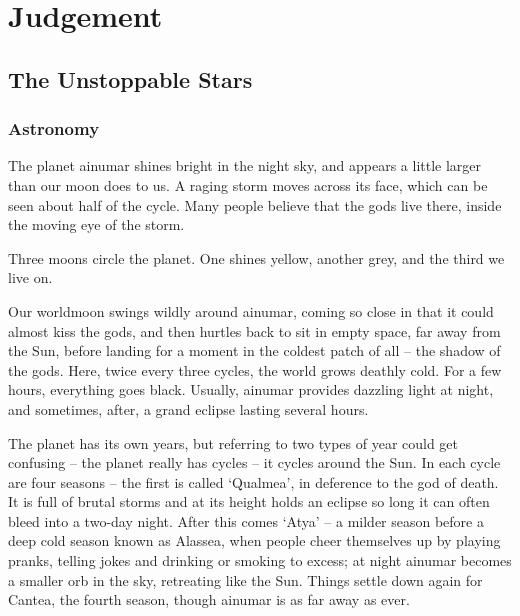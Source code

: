 \chapter[Bastion of Judgement]{Judgement}

\section{The Unstoppable Stars}
\label{astronomy}
\label{seasons}

\begin{multicols}{2}

\setcounter{season}{\month}

\subsection{Astronomy}

The planet \gls{ainumar} shines bright in the night sky, and appears a little larger than our moon does to us.
A raging storm moves across its face, which can be seen about half of the cycle.
Many people believe that the gods live there, inside the moving eye of the storm.

Three moons circle the planet.
One shines yellow, another grey, and the third we live on.

Our worldmoon swings wildly around \gls{ainumar}, coming so close in that it could almost kiss the gods, and then hurtles back to sit in empty space, far away from the Sun, before landing for a moment in the coldest patch of all -- the shadow of the gods.
Here, twice every three cycles, the world grows deathly cold.
For a few hours, everything goes black.
Usually, \gls{ainumar} provides dazzling light at night, and sometimes, after, a grand eclipse lasting several hours.

The planet has its own years, but referring to two types of year could get confusing -- the planet really has cycles -- it cycles around the Sun.
In each cycle are four seasons -- the first is called `Qualmea', in deference to the god of death.
It is full of brutal storms and at its height holds an eclipse so long it can often bleed into a two-day night.
After this comes `Atya' -- a milder season before a deep cold season known as Alassea, when people cheer themselves up by playing pranks, telling jokes and drinking or smoking to excess; at night \gls{ainumar} becomes a smaller orb in the sky, retreating like the Sun.
Things settle down again for Cantea, the fourth season, though \gls{ainumar} is as far away as ever.


\end{multicols}
